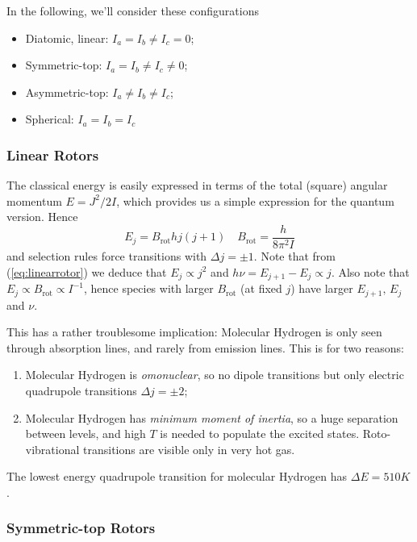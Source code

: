 In the following, we'll consider these configurations 
\begin{itemize}
    \item Diatomic, linear: $I_{a} = I_{b} \neq I_{c} = 0$;
    \item Symmetric-top: $I_{a} = I_{b} \neq I_{c} \neq 0$;
    \item Asymmetric-top: $I_{a}\neq I_{b} \neq I_{c}$;
    \item Spherical: $I_{a} = I_{b} = I_{c}$
\end{itemize}

\subsubsection{Linear Rotors}

The classical energy is easily expressed in terms of the total (square) angular momentum $E = J^{2}/2I$, which provides us a simple expression for the quantum version. Hence 
\begin{equation*}
    E_{j} = B_{\text{rot}}hj(j+1) \quad B_{\text{rot}} = \frac{h}{8\pi^{2}I}
    \label{eq:linearrotor}
\end{equation*}
and selection rules force transitions with $\Delta j = \pm 1$. Note that from (\ref{eq:linearrotor}) we deduce that $E_{j}\propto j^{2}$ and $h\nu = E_{j+1}-E_{j} \propto j$. Also note that $E_{j} \propto B_{\text{rot}} \propto I^{-1}$, hence species with larger $B_{\text{rot}}$ (at fixed $j$) have larger $E_{j+1},\,E_{j}$ and $\nu$.
\par This has a rather troublesome implication: Molecular Hydrogen is only seen through absorption lines, and rarely from emission lines. This is for two reasons:
\begin{enumerate}
    \item Molecular Hydrogen is \emph{omonuclear}, so no dipole transitions but only electric quadrupole transitions $\Delta j = \pm 2$;
    \item Molecular Hydrogen has \emph{minimum moment of inertia}, so a huge separation between levels, and high $T$ is needed to populate the excited states. Roto-vibrational transitions are visible only in very hot gas.
\end{enumerate}
The lowest energy quadrupole transition for molecular Hydrogen has $\Delta E = 510 \unit{K}$.

\subsubsection{Symmetric-top Rotors}

